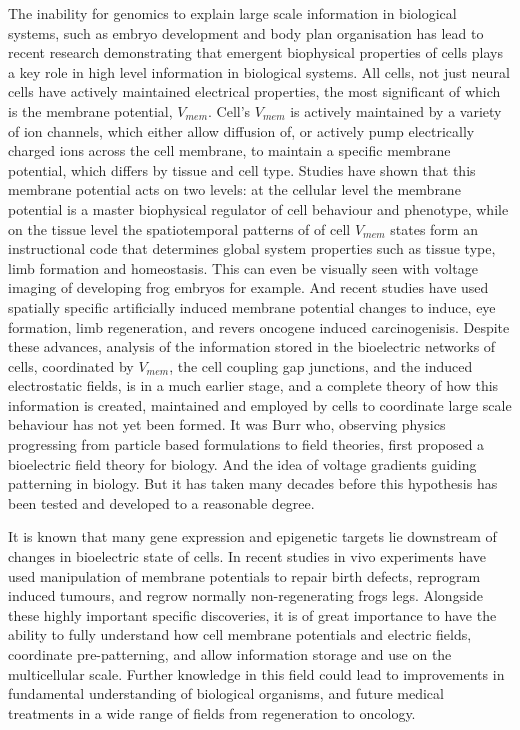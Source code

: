 \documentclass{article}
\begin{document}
\begin{flushleft}
The inability for genomics to explain large scale information in biological systems, such as embryo development and body plan organisation has lead to recent research demonstrating that emergent biophysical properties of cells plays a key role in high level information in biological systems. All cells, not just neural cells have actively maintained electrical properties, the most significant of which is the membrane potential, $V_{mem}$. Cell’s $V_{mem}$ is actively maintained by a variety of ion channels, which either allow diffusion of, or actively pump electrically charged ions across the cell membrane, to maintain a specific membrane potential, which differs by tissue and cell type. Studies have shown that this membrane potential acts on two levels: at the cellular level the membrane potential is a master biophysical regulator of cell behaviour and phenotype, while on the tissue level the spatiotemporal patterns of of cell $V_{mem}$ states form an instructional code that determines global system properties such as tissue type, limb formation and homeostasis. This can even be visually seen with voltage imaging of developing frog embryos for example. And recent studies have used spatially specific artificially induced membrane potential changes to induce, eye formation, limb regeneration, and revers oncogene induced carcinogenisis.
Despite these advances, analysis of the information stored in the bioelectric networks of cells, coordinated by $V_{mem}$, the cell coupling gap junctions, and the induced electrostatic fields, is in a much earlier stage, and a complete theory of how this information is created, maintained and employed by cells to coordinate large scale behaviour has not yet been formed.
It was Burr who, observing physics progressing from particle based formulations to field theories, first proposed a bioelectric field theory for biology. And the idea of voltage gradients guiding patterning in biology. But it has taken many decades before this hypothesis has been tested and developed to a reasonable degree.

It is known that many gene expression and epigenetic targets lie downstream of changes in bioelectric state of cells. In recent studies in vivo experiments have used manipulation of membrane potentials to repair birth defects, reprogram induced tumours, and regrow normally non-regenerating frogs legs. Alongside these highly important specific discoveries, it is of great importance to have the ability to fully understand how cell membrane potentials and electric fields, coordinate pre-patterning, and allow information storage and use on the multicellular scale. Further knowledge in this field could lead to improvements in fundamental understanding of biological organisms, and future medical treatments in a wide range of fields from regeneration to oncology.


\end{flushleft}
\end{document}
